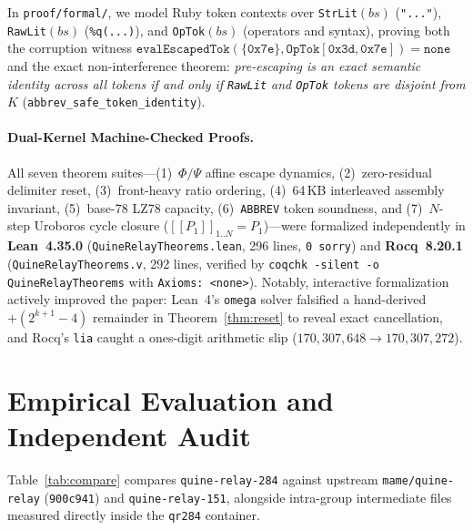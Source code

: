 \documentclass[10pt,twocolumn]{article}
\theoremstyle{definition}
\begin{document}
In \texttt{proof/formal/}, we model Ruby token contexts over \texttt{StrLit}$(bs)$ (\texttt{"..."}), \texttt{RawLit}$(bs)$ (\texttt{\%q(...)}), and \texttt{OpTok}$(bs)$ (operators and syntax), proving both the corruption witness $\texttt{evalEscapedTok}(\{\texttt{0x7e}\},\allowbreak \texttt{OpTok}[\texttt{0x3d},\texttt{0x7e}]) = \texttt{none}$ and the exact non-interference theorem: \emph{pre-escaping is an exact semantic identity across all tokens if and only if \texttt{RawLit} and \texttt{OpTok} tokens are disjoint from $K$} (\texttt{abbrev\_safe\_token\_identity}).

\paragraph{Dual-Kernel Machine-Checked Proofs.}
All seven theorem suites---(1)~$\Phi/\Psi$ affine escape dynamics, (2)~zero-residual delimiter reset, (3)~front-heavy ratio ordering, (4)~64\,KB interleaved assembly invariant, (5)~base-78 LZ78 capacity, (6)~\texttt{ABBREV} token soundness, and (7)~$N$-step Uroboros cycle closure ($[\![ P_1 ]\!]_{1..N} = P_1$)---were formalized independently in \textbf{Lean~4.35.0} (\texttt{QuineRelayTheorems.lean}, 296 lines, \texttt{0 sorry}) and \textbf{Rocq~8.20.1} (\texttt{QuineRelayTheorems.v}, 292 lines, verified by \texttt{coqchk -silent -o QuineRelayTheorems} with \texttt{Axioms: <none>}). Notably, interactive formalization actively improved the paper: Lean~4's \texttt{omega} solver falsified a hand-derived $+(2^{k+1}-4)$ remainder in Theorem~\ref{thm:reset} to reveal exact cancellation, and Rocq's \texttt{lia} caught a ones-digit arithmetic slip ($170{,}307{,}648 \to 170{,}307{,}272$).

\section{Empirical Evaluation and Independent Audit}
\label{sec:eval}

Table~\ref{tab:compare} compares \texttt{quine-relay-284} against upstream \texttt{mame/quine-relay} (\texttt{900c941}) and \texttt{quine-relay-151}, alongside intra-group intermediate files measured directly inside the \texttt{qr284} container.
\end{document}
